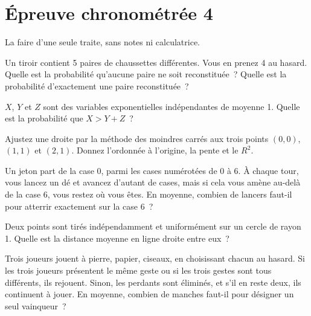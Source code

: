 \chapter{Épreuve chronométrée 4}\label{ch:iv1:timed-test-4}

\begin{ivtrains}
La faire d'une seule traite, sans notes ni calculatrice.
\end{ivtrains}


\begin{question}\label{iq:iv1:timed-test-4:1}
Un tiroir contient 5 paires de chaussettes différentes. Vous en prenez 4 au hasard. Quelle est la probabilité qu'aucune paire ne soit reconstituée~? Quelle est la probabilité d'exactement une paire reconstituée~?
\end{question}

\begin{question}\label{iq:iv1:timed-test-4:2}
$X$, $Y$ et $Z$ sont des variables exponentielles indépendantes de moyenne 1. Quelle est la probabilité que $X > Y + Z$~?
\end{question}

\begin{question}\label{iq:iv1:timed-test-4:3}
Ajustez une droite par la méthode des moindres carrés aux trois points $(0, 0)$, $(1, 1)$ et $(2, 1)$. Donnez l'ordonnée à l'origine, la pente et le $R^2$.
\end{question}

\begin{question}\label{iq:iv1:timed-test-4:4}
Un jeton part de la case 0, parmi les cases numérotées de 0 à 6. À chaque tour, vous lancez un dé et avancez d'autant de cases, mais si cela vous amène au-delà de la case 6, vous restez où vous êtes. En moyenne, combien de lancers faut-il pour atterrir exactement sur la case 6~?
\end{question}

\begin{question}\label{iq:iv1:timed-test-4:5}
Deux points sont tirés indépendamment et uniformément sur un cercle de rayon 1. Quelle est la distance moyenne en ligne droite entre eux~?
\end{question}

\begin{question}\label{iq:iv1:timed-test-4:6}
Trois joueurs jouent à pierre, papier, ciseaux, en choisissant chacun au hasard. Si les trois joueurs présentent le même geste ou si les trois gestes sont tous différents, ils rejouent. Sinon, les perdants sont éliminés, et s'il en reste deux, ils continuent à jouer. En moyenne, combien de manches faut-il pour désigner un seul vainqueur~?
\end{question}


